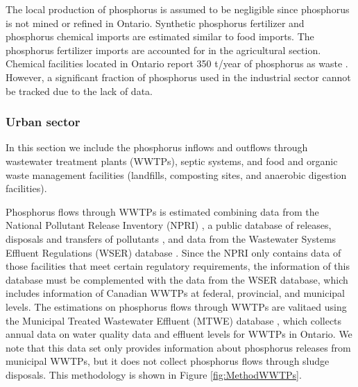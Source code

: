 \documentclass[authoryear]{elsarticle}
\begin{document}
The local production of phosphorus is assumed to be negligible since phosphorus is not mined or refined in Ontario. Synthetic phosphorus fertilizer and phosphorus chemical imports are estimated similar to food imports.  The phosphorus fertilizer imports are accounted for in the agricultural section. Chemical facilities located in Ontario report 350 t/year of phosphorus as waste \citep{PFlows_Ontario}.
However,
a significant fraction of phosphorus used in the industrial sector cannot be tracked due to the lack of data.


\subsubsection{Urban sector}
In this section we include the phosphorus inflows and outflows through wastewater treatment plants (WWTPs), septic systems, and food and organic waste management facilities (landfills, composting sites, and anaerobic digestion facilities).


Phosphorus flows through WWTPs is estimated combining data from the National Pollutant Release Inventory (NPRI) \citep{NPRI}, a public database of releases, disposals and transfers of pollutants
, and data from the Wastewater Systems Effluent Regulations (WSER) database \citep{WSER}. Since the NPRI only contains data of those facilities that meet certain regulatory requirements, the information of this database must be complemented with the data from the WSER database, which includes information of Canadian WWTPs at federal, provincial, and municipal levels. The estimations on phosphorus flows through WWTPs are valitaed using the Municipal Treated Wastewater Effluent (MTWE) database \citep{MTWE}, which collects annual data on water quality data and effluent levels for WWTPs in Ontario.
We note that this data set only provides information about phosphorus releases from municipal WWTPs, but it does not collect phosphorus flows through sludge disposals.
This methodology is shown in Figure \ref{fig:MethodWWTPs}.
\end{document}
